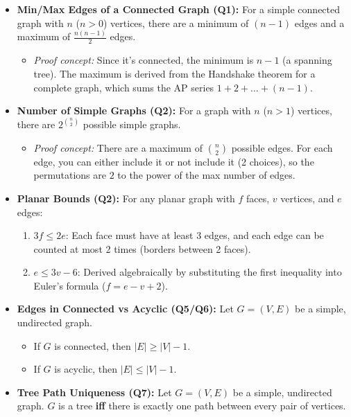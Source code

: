 \documentclass{article}
\theoremstyle{plain}
\theoremstyle{definition}
\theoremstyle{remark}
\begin{document}
\begin{itemize}
    \item \textbf{Min/Max Edges of a Connected Graph (Q1):} For a simple connected graph with $n$ ($n > 0$) vertices, there are a minimum of $(n-1)$ edges and a maximum of $\frac{n(n-1)}{2}$ edges.
    \begin{itemize}
        \item \textit{Proof concept:} Since it's connected, the minimum is $n-1$ (a spanning tree). The maximum is derived from the Handshake theorem for a complete graph, which sums the AP series $1 + 2 + \dots + (n-1)$.
    \end{itemize}
    \item \textbf{Number of Simple Graphs (Q2):} For a graph with $n$ ($n > 1$) vertices, there are $2^{\binom{n}{2}}$ possible simple graphs.
    \begin{itemize}
        \item \textit{Proof concept:} There are a maximum of $\binom{n}{2}$ possible edges. For each edge, you can either include it or not include it (2 choices), so the permutations are $2$ to the power of the max number of edges.
    \end{itemize}
    \item \textbf{Planar Bounds (Q2):} For any planar graph with $f$ faces, $v$ vertices, and $e$ edges:
    \begin{enumerate}[label=(\alph*)]
        \item $3f \leq 2e$: Each face must have at least 3 edges, and each edge can be counted at most 2 times (borders between 2 faces).
        \item $e \leq 3v - 6$: Derived algebraically by substituting the first inequality into Euler's formula ($f = e - v + 2$).
    \end{enumerate}
    \item \textbf{Edges in Connected vs Acyclic (Q5/Q6):} Let $G = (V,E)$ be a simple, undirected graph.
    \begin{itemize}
        \item If $G$ is connected, then $|E| \geq |V| - 1$.
        \item If $G$ is acyclic, then $|E| \leq |V| - 1$.
    \end{itemize}
    \item \textbf{Tree Path Uniqueness (Q7):} Let $G = (V,E)$ be a simple, undirected graph. $G$ is a tree \textbf{iff} there is exactly one path between every pair of vertices.
\end{itemize}
\end{document}
